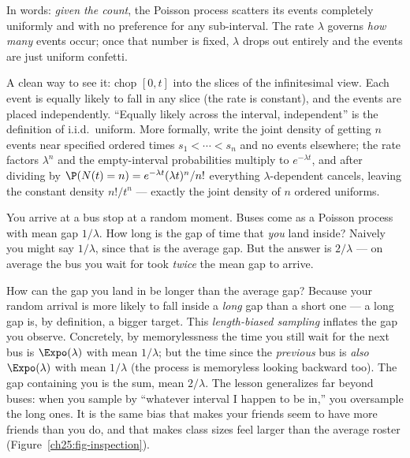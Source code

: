 In words: \emph{given the count}, the Poisson process scatters its events
completely uniformly and with no preference for any sub-interval. The rate
$\lambda$ governs \emph{how many} events occur; once that number is fixed,
$\lambda$ drops out entirely and the events are just uniform confetti.

\begin{whybox}
A clean way to see it: chop $[0,t]$ into the slices of the infinitesimal view.
Each event is equally likely to fall in any slice (the rate is constant), and the
events are placed independently. ``Equally likely across the interval,
independent'' is the definition of i.i.d.\ uniform. More formally, write the joint
density of getting $n$ events near specified ordered times $s_1<\cdots<s_n$ and no
events elsewhere; the rate factors $\lambda^n$ and the empty-interval
probabilities multiply to $e^{-\lambda t}$, and after dividing by
$\P(N(t)=n)=e^{-\lambda t}(\lambda t)^n/n!$ everything $\lambda$-dependent
cancels, leaving the constant density $n!/t^n$ --- exactly the joint density of
$n$ ordered uniforms.
\end{whybox}

\begin{paradoxbox}
You arrive at a bus stop at a random moment. Buses come as a Poisson process with
mean gap $1/\lambda$. How long is the gap of time that \emph{you} land inside?
Naively you might say $1/\lambda$, since that is the average gap. But the answer
is $2/\lambda$ --- on average the bus you wait for took \emph{twice} the mean gap
to arrive.

How can the gap you land in be longer than the average gap? Because your random
arrival is more likely to fall inside a \emph{long} gap than a short one --- a
long gap is, by definition, a bigger target. This \emph{length-biased sampling}
inflates the gap you observe. Concretely, by memorylessness the time you still
wait for the next bus is $\Expo(\lambda)$ with mean $1/\lambda$; but the time
since the \emph{previous} bus is \emph{also} $\Expo(\lambda)$ with mean
$1/\lambda$ (the process is memoryless looking backward too). The gap containing
you is the sum, mean $2/\lambda$. The lesson generalizes far beyond buses: when
you sample by ``whatever interval I happen to be in,'' you oversample the long
ones. It is the same bias that makes your friends seem to have more friends than
you do, and that makes class sizes feel larger than the average roster
(Figure~\ref{ch25:fig-inspection}).
\end{paradoxbox}

